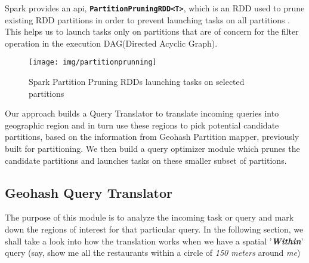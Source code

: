 \documentclass[article,type=msc,colorback,12pt,accentcolor=tud1d]{tudthesis}
\begin{document}
				Spark provides an api, \textbf{\texttt{PartitionPruningRDD<T>}}, which is an RDD used to prune existing RDD partitions in order to prevent launching tasks on all partitions \cite{sparkapiPartitionPruning}. This helps us to launch tasks only on partitions that are of concern for the filter operation in the execution DAG(Directed Acyclic Graph). 
				
									
					\begin{figure}[h]
					\centering
					\texttt{[image: img/partitionprunning]}
					\caption{Spark Partition Pruning RDDs launching tasks on selected partitions}
					\label{fig:partitionprunning}
					\end{figure}
					
					Our approach builds a Query Translator to translate incoming queries into geographic region and in turn use these regions to pick potential candidate partitions, based on the information from Geohash Partition mapper, previously built for partitioning. We then build a query optimizer module which prunes the candidate partitions and launches tasks on these smaller subset of partitions.
									
		\subsection{Geohash Query Translator}
		
		\par The purpose of this module is to analyze the incoming task or query and mark down the regions of interest for that particular query. In the following section, we shall take a look into how the translation works when we have a spatial '\textbf{\textit{Within}}' query (say, show me all the restaurants within a circle of \textit{150 meters} around \textit{me})
\end{document}
